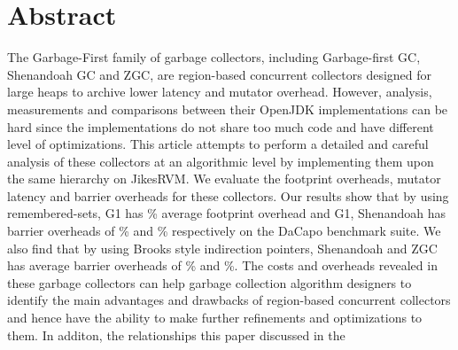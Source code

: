 \chapter*{Abstract}
\vspace{-1em}

The Garbage-First family of garbage collectors, including Garbage-first GC,
Shenandoah GC and ZGC, are region-based concurrent collectors designed for
large heaps to archive lower latency and mutator overhead. However, analysis,
measurements and comparisons between their OpenJDK implementations can be
hard since the implementations do not share too much code and have different
level of optimizations. This article attempts to perform a detailed and
careful analysis of these collectors at an algorithmic level by implementing
them upon the same hierarchy on JikesRVM. We evaluate the footprint overheads,
mutator latency and barrier overheads for these collectors. Our results show
that by using remembered-sets, G1 has \% average footprint overhead
and G1, Shenandoah has barrier overheads of \% and \%
respectively on the DaCapo benchmark suite. We also find that by using Brooks
style indirection pointers, Shenandoah and ZGC has average barrier overheads
of \% and \%. The costs and overheads revealed in these
garbage collectors can help garbage collection algorithm designers to identify
the main advantages and drawbacks of region-based concurrent collectors and
hence have the ability to make further refinements and optimizations to them. In
additon, the relationships this paper discussed in the 

